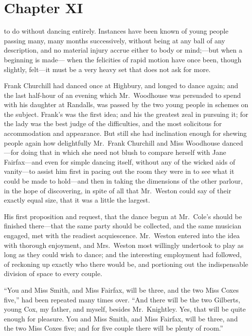 \chapter{Chapter XI}


 to do without dancing entirely.  Instances have
been known of young people passing many, many months successively,
without being at any ball of any description, and no material injury
accrue either to body or mind;---but when a beginning is made---%
when the felicities of rapid motion have once been, though slightly,
felt---it must be a very heavy set that does not ask for more.

Frank Churchill had danced once at Highbury, and longed to dance again;
and the last half-hour of an evening which Mr.\ Woodhouse was persuaded
to spend with his daughter at Randalls, was passed by the two young
people in schemes on the subject.  Frank's was the first idea;
and his the greatest zeal in pursuing it; for the lady was the best
judge of the difficulties, and the most solicitous for accommodation
and appearance.  But still she had inclination enough for shewing
people again how delightfully Mr.\ Frank Churchill and Miss
Woodhouse danced---for doing that in which she need not blush to compare
herself with Jane Fairfax---and even for simple dancing itself,
without any of the wicked aids of vanity---to assist him first
in pacing out the room they were in to see what it could be made
to hold---and then in taking the dimensions of the other parlour,
in the hope of discovering, in spite of all that Mr.\ Weston could
say of their exactly equal size, that it was a little the largest.

His first proposition and request, that the dance begun at Mr.\ Cole's
should be finished there---that the same party should be collected,
and the same musician engaged, met with the readiest acquiescence.
Mr.\ Weston entered into the idea with thorough enjoyment,
and Mrs.\ Weston most willingly undertook to play as long as they
could wish to dance; and the interesting employment had followed,
of reckoning up exactly who there would be, and portioning out the
indispensable division of space to every couple.

``You and Miss Smith, and Miss Fairfax, will be three, and the two
Miss Coxes five,'' had been repeated many times over.  ``And there
will be the two Gilberts, young Cox, my father, and myself,
besides Mr.\ Knightley.  Yes, that will be quite enough for pleasure.
You and Miss Smith, and Miss Fairfax, will be three, and the two Miss
Coxes five; and for five couple there will be plenty of room.''

